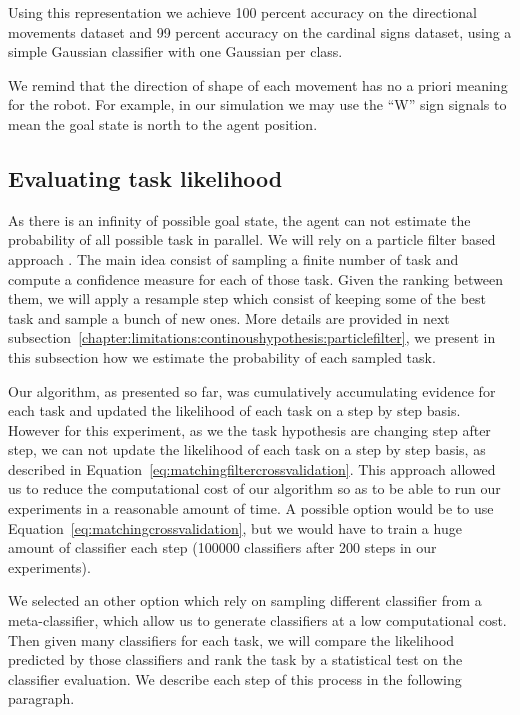 Using this representation we achieve 100 percent accuracy on the directional movements dataset and 99 percent accuracy on the cardinal signs dataset, using a simple Gaussian classifier with one Gaussian per class.

We remind that the direction of shape of each movement has no a priori meaning for the robot. For example, in our simulation we may use the ``W'' sign signals to mean the goal state is north to the agent position.

\subsection{Evaluating task likelihood}

As there is an infinity of possible goal state, the agent can not estimate the probability of all possible task in parallel. We will rely on a particle filter based approach \cite{gordon1993novel,doucet2009tutorial,thrun2002particle}. The main idea consist of sampling a finite number of task and compute a confidence measure for each of those task. Given the ranking between them, we will apply a resample step which consist of keeping some of the best task and sample a bunch of new ones. More details are provided in next subsection~\ref{chapter:limitations:continoushypothesis:particlefilter}, we present in this subsection how we estimate the probability of each sampled task.

Our algorithm, as presented so far, was cumulatively accumulating evidence for each task and updated the likelihood of each task on a step by step basis. However for this experiment, as we the task hypothesis are changing step after step, we can not update the likelihood of each task on a step by step basis, as described in Equation~\ref{eq:matchingfiltercrossvalidation}. This approach allowed us to reduce the computational cost of our algorithm so as to be able to run our experiments in a reasonable amount of time. A possible option would be to use Equation~\ref{eq:matchingcrossvalidation}, but we would have to train a huge amount of classifier each step (100000 classifiers after 200 steps in our experiments).

We selected an other option which rely on sampling different classifier from a meta-classifier, which allow us to generate classifiers at a low computational cost. Then given many classifiers for each task, we will compare the likelihood predicted by those classifiers and rank the task by a statistical test on the classifier evaluation. We describe each step of this process in the following paragraph.

